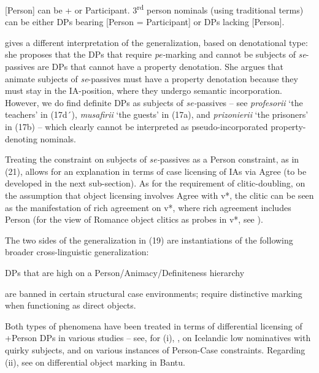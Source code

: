 \documentclass[output=paper]{langsci/langscibook}
\begin{document}
[Person] can be + or \textminus{}Participant. 3\textsuperscript{rd} person nominals (using traditional terms) can be either DPs bearing [Person = \textminus{}Participant] or DPs lacking [Person].

\citet{Cornilescu1998} gives a different interpretation of the generalization, based on denotational type: she proposes that the DPs that require \textit{pe-}marking and cannot be subjects of \textit{se}{}-passives are DPs that cannot have a property denotation. She argues that animate subjects of \textit{se}{}-passives must have a property denotation because they must stay in the IA-position, where they undergo semantic incorporation. However, we do find definite DPs as subjects of \textit{se-}passives – see \textit{profesorii} ‘the teachers’ in (17d´), \textit{musafirii} ‘the guests’ in (17a), and \textit{prizonierii} ‘the prisoners’ in (17b) – which clearly cannot be interpreted as pseudo-incorporated property-denoting nominals.

Treating the constraint on subjects of \textit{se-}passives as a Person constraint, as in (21), allows for an explanation in terms of case licensing of IAs via Agree (to be developed in the next sub-section). As for the requirement of clitic-doubling, on the assumption that object licensing involves Agree with v*, the clitic can be seen as the manifestation of rich agreement on v*, where rich agreement includes Person (for the view of Romance object clitics as probes in v*, see \citealt{Roberts2010}).

The two sides of the generalization in (19) are instantiations of the following broader cross-linguistic generalization:

\ea%
    DPs that are high on a Person/Animacy/Definiteness hierarchy\label{ex:giurgea:22}\\
        \begin{xlisti}
        \ex are banned in certain structural case environments;
        \ex require distinctive marking when functioning as direct objects.
        \end{xlisti}
\z

Both types of phenomena have been treated in terms of differential licensing of +Person DPs in various studies – see, for (i), \citet{Sigurðsson2004,Sigurðsson2011,Sigurðsson2012,Sigurðsson2008}, on Icelandic low nominatives with quirky subjects, and \citet{Rezac2011} on various instances of Person-Case constraints. Regarding (ii), see \citet{VanderWal2015} on differential object marking in Bantu.
\end{document}
